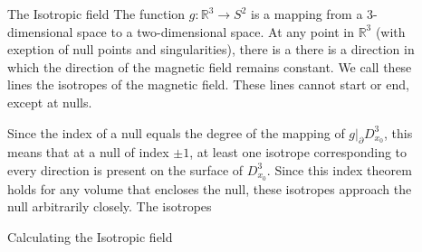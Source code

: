 \documentclass[final]{beamer}
\newlength{\sepwid}
\newlength{\onecolwid}
\newlength{\twocolwid}
\begin{document}
\begin{frame}[t]
\begin{columns}[t]
\begin{column}{\twocolwid}
\begin{columns}[t,totalwidth=\twocolwid]
\end{columns} %
\end{column} %

\begin{column}{\sepwid}\end{column} %

\begin{column}{\onecolwid} %


%

\begin{block}{The Isotropic field}
    The function $g:\mathbb{R}^3\rightarrow S^2$ 
    is a mapping from a 3-dimensional space to a two-dimensional space.
    At any point in $\mathbb{R}^3$ (with exeption of null points and singularities), 
    there is a there is a direction in which the direction
    of the magnetic field remains constant. 
    We call these lines the isotropes of the magnetic field. 
    These lines cannot start or end, except at nulls. 

    Since the index of a null equals the degree of the mapping of $g|_\partial D^3_{x_0}$, 
    this means that at a null of index $\pm 1$, at least one isotrope corresponding to every
    direction is present on the surface of $D^3_{x_0}$. 
    Since this index theorem holds for any volume that encloses the null, these isotropes
    approach the null arbitrarily closely. 
    The isotropes  
    


\end{block}


\begin{block}{Calculating the Isotropic field}


\end{block}
\end{column}
\end{columns}
\end{frame}
\end{document}
